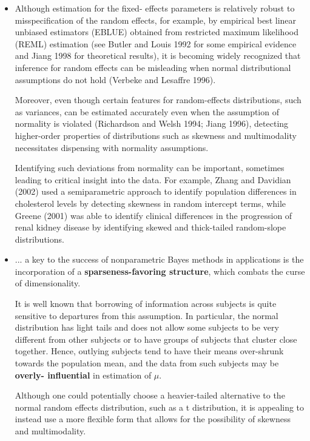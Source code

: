\documentclass{article}
\begin{document}
\begin{itemize}
\item \cite{ishwaran2002independent} Although estimation for the fixed- effects parameters is relatively robust to misspecification of the random effects, for example, by empirical best linear unbiased estimators (EBLUE) obtained from restricted maximum likelihood (REML) estimation (see Butler and Louis 1992 for some empirical evidence and Jiang 1998 for theoretical results), it is becoming widely recognized that inference for random effects can be misleading when normal distributional assumptions do not hold (Verbeke and Lesaffre 1996).\par

Moreover, even though certain features for random-effects distributions, such as variances, can be estimated accurately even when the assumption of normality is violated (Richardson and Welsh 1994; Jiang 1996), detecting higher-order properties of distributions such as skewness and multimodality necessitates dispensing with normality assumptions. \par

Identifying such deviations from normality can be important, sometimes leading to critical insight into the data. For example, Zhang and Davidian (2002) used a semiparametric approach to identify population differences in cholesterol levels by detecting skewness in random intercept terms, while Greene (2001) was able to identify clinical differences in the progression of renal kidney disease by identifying skewed and thick-tailed random-slope distributions.

\item \cite{dunson2010nonparametric} ... a key to the success of nonparametric Bayes methods in applications is the incorporation of a {\bf sparseness-favoring structure}, which combats the curse of dimensionality.\par

It is well known that borrowing of information across subjects is quite sensitive to departures from this assumption. In particular, the normal distribution has light tails and does not allow some subjects to be very different from other subjects or to have groups of subjects that cluster close together. Hence, outlying subjects tend to have their means over-shrunk towards the population mean, and the data from such subjects may be {\bf overly- influential} in estimation of $\mu$.\par

Although one could potentially choose a heavier-tailed alternative to the normal random effects distribution, such as a t distribution, it is appealing to instead use a more flexible form that allows for the possibility of skewness and multimodality.\par


\end{itemize}
\end{document}
